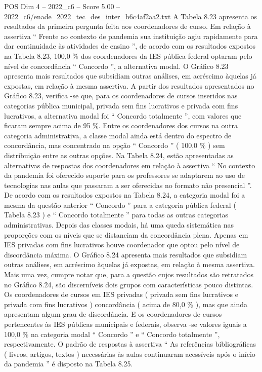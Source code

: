 \begin{textsample}{POS Dim 4 – 2022\_c6 – Score 5.00 – 2022\_c6/enade\_2022\_tec\_des\_inter\_b6c4af2aa2.txt}
A Tabela 8.23 apresenta os resultados da primeira pergunta feita aos coordenadores de curso.
Em relação à assertiva “ Frente ao contexto de pandemia sua instituição agiu rapidamente para dar continuidade às atividades de ensino ”, de acordo com os resultados expostos na Tabela 8.23, 100,0 \% dos coordenadores da IES pública federal optaram pelo nível de concordância “ Concordo ”, a alternativa modal.
O Gráfico 8.23 apresenta mais resultados que subsidiam outras análises, em acréscimo àquelas já expostas, em relação à mesma assertiva.
A partir dos resultados apresentados no Gráfico 8.23, verifica -se que, para os coordenadores de cursos inseridos nas categorias pública municipal, privada sem fins lucrativos e privada com fins lucrativos, a alternativa modal foi “ Concordo totalmente ”, com valores que ficaram sempre acima de 95 \%.
Entre os coordenadores dos cursos na outra categoria administrativa, a classe modal ainda está dentro do espectro de concordância, mas concentrado na opção “ Concordo ” ( 100,0 \% ) sem distribuição entre as outras opções.
Na Tabela 8.24, estão apresentadas as alternativas de respostas dos coordenadores em relação à assertiva “ No contexto da pandemia foi oferecido suporte para os professores se adaptarem ao uso de tecnologias nas aulas que passaram a ser oferecidas no formato não presencial ”.
De acordo com os resultados expostos na Tabela 8.24, a categoria modal foi a mesma da questão anterior “ Concordo ” para a categoria pública federal ( Tabela 8.23 ) e “ Concordo totalmente ” para todas as outras categorias administrativas.
Depois das classes modais, há uma queda sistemática nas proporções com os níveis que se distanciam da concordância plena.
Apenas em IES privadas com fins lucrativos houve coordenador que optou pelo nível de discordância máxima.
O Gráfico 8.24 apresenta mais resultados que subsidiam outras análises, em acréscimo àquelas já expostas, em relação à mesma assertiva.
Mais uma vez, cumpre notar que, para a questão cujos resultados são retratados no Gráfico 8.24, são discerníveis dois grupos com características pouco distintas.
Os coordenadores de cursos em IES privadas ( privada sem fins lucrativos e privada com fins lucrativos ) concordância ( acima de 80,0 \% ), mas que ainda apresentam algum grau de discordância.
E os coordenadores de cursos pertencentes às IES públicas municipais e federais, observa -se valores iguais a 100,0 \% na categoria modal “ Concordo ” e “ Concordo totalmente ”, respectivamente.
O padrão de respostas à assertiva “ As referências bibliográficas ( livros, artigos, textos ) necessárias às aulas continuaram acessíveis após o início da pandemia ” é disposto na Tabela 8.25.

\end{textsample}
